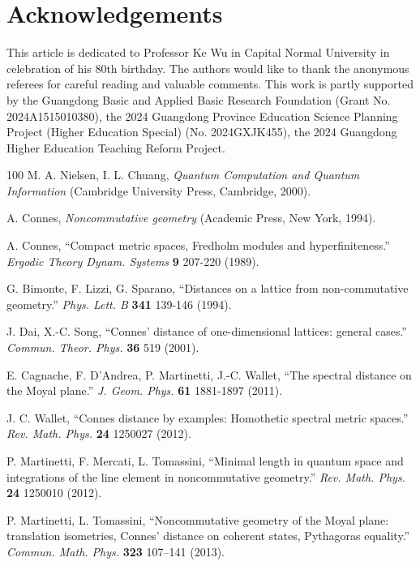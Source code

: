 \documentclass[a4paper,12pt]{article}
\begin{document}
\section*{Acknowledgements}
This article is dedicated to Professor Ke Wu in Capital Normal University in celebration of his 80th birthday.
The authors would like to thank the anonymous referees for careful reading and valuable comments. This work is partly supported by the Guangdong Basic and Applied Basic Research Foundation (Grant No. 2024A1515010380), the 2024 Guangdong Province Education Science Planning Project (Higher Education Special) (No. 2024GXJK455), the 2024 Guangdong Higher Education Teaching Reform Project.





\begin{thebibliography}{100}
 M. A. Nielsen, I. L. Chuang, {\it Quantum Computation and Quantum Information} (Cambridge University Press, Cambridge, 2000).

 A. Connes, {\it Noncommutative geometry} (Academic Press, New York, 1994).

 A. Connes, ``Compact metric spaces, Fredholm modules and hyperfiniteness.'' {\it Ergodic Theory Dynam. Systems} {\bf 9} 207-220 (1989).

 G. Bimonte, F. Lizzi, G. Sparano, ``Distances on a lattice from non-commutative geometry.'' {\it Phys. Lett. B} {\bf 341} 139-146 (1994).

 J. Dai, X.-C. Song, ``Connes' distance of one-dimensional lattices: general cases.'' {\it Commun. Theor. Phys.} {\bf 36} 519 (2001).

 E. Cagnache, F. D'Andrea, P. Martinetti, J.-C. Wallet, ``The spectral distance on the Moyal plane.'' {\it J. Geom. Phys.} {\bf 61} 1881-1897 (2011).

 J. C. Wallet, ``Connes distance by examples: Homothetic spectral metric spaces.'' {\it Rev. Math. Phys.} {\bf 24} 1250027 (2012).

 P. Martinetti, F. Mercati, L. Tomassini, ``Minimal length in quantum space and integrations of the line element in noncommutative geometry.'' {\it Rev. Math. Phys.} {\bf 24} 1250010 (2012).

 P. Martinetti, L. Tomassini, ``Noncommutative geometry of the Moyal plane: translation isometries, Connes’ distance on coherent states, Pythagoras equality.'' {\it Commun. Math. Phys.} {\bf 323} 107–141 (2013).


\end{thebibliography}
\end{document}
